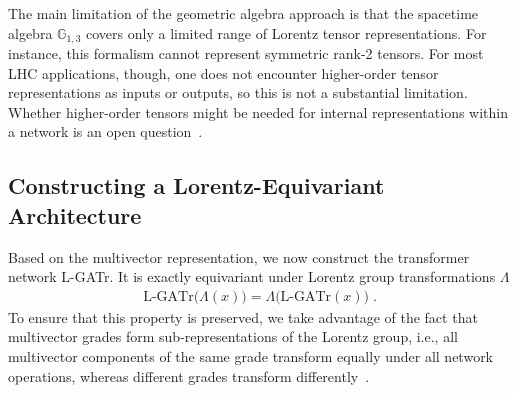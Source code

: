 \documentclass[submission, Phys]{SciPost}
\begin{document}
The main limitation of the geometric algebra approach is that the spacetime algebra $\mathbb{G}_{1,3}$ covers only a limited range of Lorentz tensor representations. For instance, this formalism cannot represent symmetric rank-2 tensors. For most LHC applications, though, one does not encounter higher-order tensor representations as inputs or outputs, so this is not a substantial limitation.  Whether higher-order tensors might be needed for internal representations within a network is an open question~\cite{DBLP:journals/corr/abs-2106-06610}.

\subsection{Constructing a Lorentz-Equivariant Architecture}

Based on the multivector representation, we now construct the transformer network L-GATr. It is exactly equivariant under Lorentz group transformations $\Lambda$
%
\begin{align}
    \text{L-GATr}\Big(\Lambda(x)\Big) = \Lambda \Big(\text{L-GATr}(x)\Big) \; .
\end{align}
%
To ensure that this property is preserved, we take advantage of the fact that multivector grades form sub-representations of the Lorentz group, i.e., all multivector components of the same grade transform equally under all network operations, whereas different grades transform differently~\cite{brehmer2023geometric,Spinner:2024hjm}.
\end{document}
